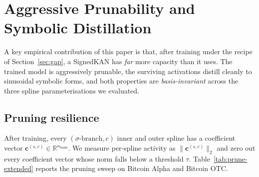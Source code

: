 \section{Aggressive Prunability and Symbolic Distillation}
\label{sec:pruning}

A key empirical contribution of this paper is that, after training
under the recipe of Section~\ref{sec:gap}, a SignedKAN has
\emph{far} more capacity than it uses. The trained model is
aggressively prunable, the surviving activations distill cleanly to
sinusoidal symbolic forms, and both properties are
\emph{basis-invariant} across the three spline parameterisations we
evaluated.

\subsection{Pruning resilience}
\label{sec:pruning-resilience}

After training, every $(\sigma\text{-branch}, c)$ inner and outer
spline has a coefficient vector $\mathbf{c}^{(s, c)} \in
\mathbb{R}^{n_\mathrm{basis}}$. We measure per-spline activity as
$\|\mathbf{c}^{(s, c)}\|_2$ and zero out every coefficient vector
whose norm falls below a threshold $\tau$.
Table~\ref{tab:prune-extended} reports the pruning sweep on Bitcoin
Alpha and Bitcoin OTC.

